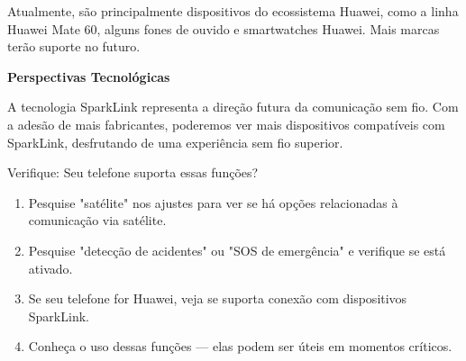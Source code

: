 Atualmente, são principalmente dispositivos do ecossistema Huawei, como a linha Huawei Mate 60, alguns fones de ouvido e smartwatches Huawei. Mais marcas terão suporte no futuro.

\textbf{Perspectivas Tecnológicas}\par

A tecnologia SparkLink representa a direção futura da comunicação sem fio. Com a adesão de mais fabricantes, poderemos ver mais dispositivos compatíveis com SparkLink, desfrutando de uma experiência sem fio superior.

\begin{tcbpractice}{Verifique: Seu telefone suporta essas funções?}
\begin{enumerate}
  \item Pesquise "satélite" nos ajustes para ver se há opções relacionadas à comunicação via satélite.
  \item Pesquise "detecção de acidentes" ou "SOS de emergência" e verifique se está ativado.
  \item Se seu telefone for Huawei, veja se suporta conexão com dispositivos SparkLink.
  \item Conheça o uso dessas funções — elas podem ser úteis em momentos críticos.
\end{enumerate}

\end{tcbpractice}

